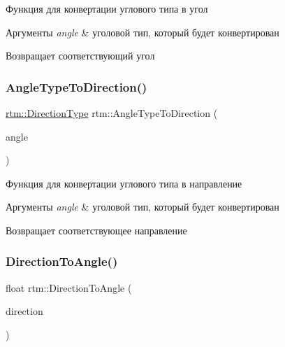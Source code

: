 Функция для конвертации углового типа в угол 


\begin{DoxyParams}{Аргументы}
{\em angle} & уголовой тип, который будет конвертирован \\
\hline
\end{DoxyParams}
\begin{DoxyReturn}{Возвращает}
соответствующий угол 
\end{DoxyReturn}
\mbox{\label{namespacertm_abeb9a79e27bc0c8c4c3e6cd9ec802627}} 
\subsubsection{\texorpdfstring{Angle\+Type\+To\+Direction()}{AngleTypeToDirection()}}
{\footnotesize\ttfamily \hyperlink{namespacertm_a57b216f3aeb45041f3461bab08bc3aeb}{rtm\+::\+Direction\+Type} rtm\+::\+Angle\+Type\+To\+Direction (\begin{DoxyParamCaption}\item[{\hyperlink{namespacertm_a69dc82b16a0148c10962caa83d930f89}{Angle\+Type}}]{angle }\end{DoxyParamCaption})}



Функция для конвертации углового типа в направление 


\begin{DoxyParams}{Аргументы}
{\em angle} & уголовой тип, который будет конвертирован \\
\hline
\end{DoxyParams}
\begin{DoxyReturn}{Возвращает}
соответствующее направление 
\end{DoxyReturn}
\mbox{\label{namespacertm_a173759dd130d0f30d1f90fba11506bd6}} 
\subsubsection{\texorpdfstring{Direction\+To\+Angle()}{DirectionToAngle()}}
{\footnotesize\ttfamily float rtm\+::\+Direction\+To\+Angle (\begin{DoxyParamCaption}\item[{\hyperlink{namespacertm_a57b216f3aeb45041f3461bab08bc3aeb}{Direction\+Type}}]{direction }\end{DoxyParamCaption})}



